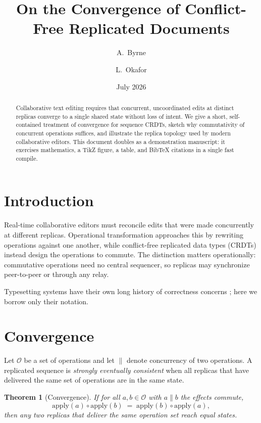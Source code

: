 \documentclass[11pt]{article}
\title{On the Convergence of Conflict-Free Replicated Documents}
\author{A.~Byrne \and L.~Okafor}
\date{July 2026}
\newtheorem{theorem}{Theorem}
\begin{document}
\maketitle

\begin{abstract}
Collaborative text editing requires that concurrent, uncoordinated edits at
distinct replicas converge to a single shared state without loss of intent.
We give a short, self-contained treatment of convergence for sequence CRDTs,
sketch why commutativity of concurrent operations suffices, and illustrate
the replica topology used by modern collaborative editors. This document
doubles as a demonstration manuscript: it exercises mathematics, a TikZ
figure, a table, and BibTeX citations in a single fast compile.
\end{abstract}

\section{Introduction}

Real-time collaborative editors must reconcile edits that were made
concurrently at different replicas. Operational transformation
\cite{ellis1989concurrency} approaches this by rewriting operations against
one another, while conflict-free replicated data types (CRDTs)
\cite{shapiro2011crdt} instead design the operations to commute. The
distinction matters operationally: commutative operations need no central
sequencer, so replicas may synchronize peer-to-peer or through any relay.

Typesetting systems have their own long history of correctness concerns
\cite{knuth1984texbook,lamport1994latex}; here we borrow only their notation.

\section{Convergence}

Let $\mathcal{O}$ be a set of operations and let $\parallel$ denote
concurrency of two operations. A replicated sequence is \emph{strongly
eventually consistent} when all replicas that have delivered the same set of
operations are in the same state.

\begin{theorem}[Convergence]\label{thm:conv}
If for all $a, b \in \mathcal{O}$ with $a \parallel b$ the effects commute,
\begin{equation}
  \mathrm{apply}(a) \circ \mathrm{apply}(b)
  \;=\;
  \mathrm{apply}(b) \circ \mathrm{apply}(a),
  \label{eq:commute}
\end{equation}
then any two replicas that deliver the same operation set reach equal states.
\end{theorem}
\end{document}
